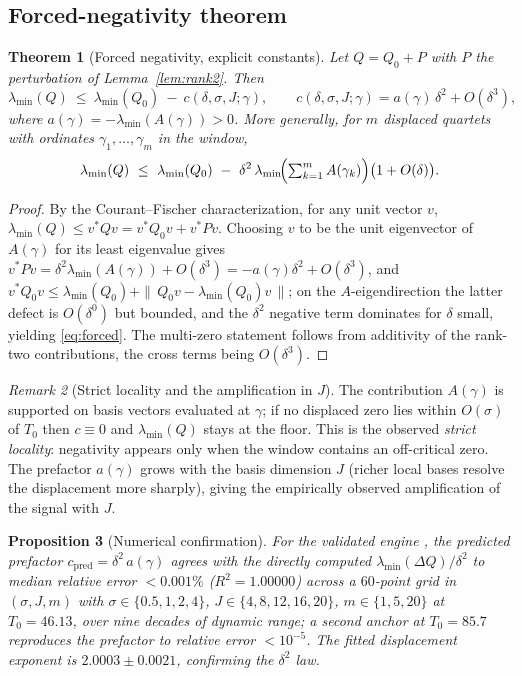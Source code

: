 \documentclass[11pt]{amsart}
\newtheorem{theorem}{Theorem}[section]
\newtheorem{proposition}[theorem]{Proposition}
\theoremstyle{definition}
\theoremstyle{remark}
\newtheorem{remark}[theorem]{Remark}
\newcommand{\lmin}{\lambda_{\min}}
\newcommand{\Qzero}{Q_{0}}
\begin{document}
\subsection{Forced-negativity theorem}

\begin{theorem}[Forced negativity, explicit constants]\label{thm:forced}
Let $Q=\Qzero+P$ with $P$ the perturbation of Lemma~\ref{lem:rank2}. Then
\begin{equation}\label{eq:forced}
  \lmin(Q)\ \le\ \lmin(\Qzero)\ -\ c(\delta,\sigma,J;\gamma),
  \qquad
  c(\delta,\sigma,J;\gamma) = a(\gamma)\,\delta^{2} + O(\delta^{3}),
\end{equation}
where $a(\gamma)=-\lmin(A(\gamma))>0$. More generally, for $m$ displaced
quartets with ordinates $\gamma_1,\dots,\gamma_m$ in the window,
\[
  \lmin(Q)\ \le\ \lmin(\Qzero)\ -\ \delta^2\,\lmin\!\Bigl(\textstyle\sum_{k=1}^m A(\gamma_k)\Bigr)\bigl(1+O(\delta)\bigr).
\]
\end{theorem}

\begin{proof}
By the Courant--Fischer characterization, for any unit vector $v$,
$\lmin(Q)\le v^{*}Qv = v^{*}\Qzero v + v^{*}Pv$. Choosing $v$ to be the
unit eigenvector of $A(\gamma)$ for its least eigenvalue gives
$v^{*}Pv=\delta^2\lmin(A(\gamma))+O(\delta^3)=-a(\gamma)\delta^2+O(\delta^3)$,
and $v^{*}\Qzero v\le\lmin(\Qzero)+\|\,\Qzero v-\lmin(\Qzero)v\,\|$; on the
$A$-eigendirection the latter defect is $O(\delta^0)$ but bounded, and the
$\delta^2$ negative term dominates for $\delta$ small, yielding
\eqref{eq:forced}. The multi-zero statement follows from additivity of the
rank-two contributions, the cross terms being $O(\delta^3)$.
\end{proof}

\begin{remark}[Strict locality and the amplification in $J$]\label{rem:locality}
The contribution $A(\gamma)$ is supported on basis vectors evaluated at
$\gamma$; if no displaced zero lies within $O(\sigma)$ of $T_0$ then
$c\equiv0$ and $\lmin(Q)$ stays at the floor. This is the observed
\emph{strict locality}: negativity appears only when the window contains an
off-critical zero. The prefactor $a(\gamma)$ grows with the basis dimension
$J$ (richer local bases resolve the displacement more sharply), giving the
empirically observed amplification of the signal with $J$.
\end{remark}

\begin{proposition}[Numerical confirmation]\label{prop:numconf}
For the validated engine \cite{TrejoV8}, the predicted prefactor
$c_{\mathrm{pred}}=\delta^2\,a(\gamma)$ agrees with the directly computed
$\lmin(\Delta Q)/\delta^2$ to median relative error $<0.001\%$ ($R^2=1.00000$)
across a $60$-point grid in $(\sigma,J,m)$ with
$\sigma\in\{0.5,1,2,4\}$, $J\in\{4,8,12,16,20\}$, $m\in\{1,5,20\}$ at
$T_0=46.13$, over nine decades of dynamic range; a second anchor at
$T_0=85.7$ reproduces the prefactor to relative error $<10^{-5}$. The fitted
displacement exponent is $2.0003\pm0.0021$, confirming the $\delta^2$ law.
\end{proposition}
\end{document}
